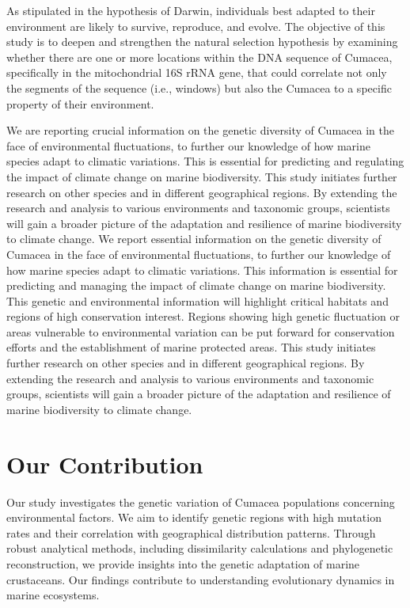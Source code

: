 As stipulated in the hypothesis of Darwin, individuals best adapted to their environment are likely to survive, reproduce, and evolve. The objective of this study is to deepen and strengthen the natural selection hypothesis by examining whether there are one or more locations within the DNA sequence of Cumacea, specifically in the mitochondrial 16S rRNA gene, that could correlate not only the segments of the sequence (i.e., windows) but also the Cumacea to a specific property of their environment. 

We are reporting crucial information on the genetic diversity of Cumacea in the face of environmental fluctuations, to further our knowledge of how marine species adapt to climatic variations. This is essential for predicting and regulating the impact of climate change on marine biodiversity. This study initiates further research on other species and in different geographical regions. By extending the research and analysis to various environments and taxonomic groups, scientists will gain a broader picture of the adaptation and resilience of marine biodiversity to climate change. We report essential information on the genetic diversity of Cumacea in the face of environmental fluctuations, to further our knowledge of how marine species adapt to climatic variations. This information is essential for predicting and managing the impact of climate change on marine biodiversity. This genetic and environmental information will highlight critical habitats and regions of high conservation interest. Regions showing high genetic fluctuation or areas vulnerable to environmental variation can be put forward for conservation efforts and the establishment of marine protected areas. This study initiates further research on other species and in different geographical regions. By extending the research and analysis to various environments and taxonomic groups, scientists will gain a broader picture of the adaptation and resilience of marine biodiversity to climate change.

\section{Our Contribution}

Our study investigates the genetic variation of Cumacea populations concerning environmental factors. We aim to identify genetic regions with high mutation rates and their correlation with geographical distribution patterns. Through robust analytical methods, including dissimilarity calculations and phylogenetic reconstruction, we provide insights into the genetic adaptation of marine crustaceans. Our findings contribute to understanding evolutionary dynamics in marine ecosystems.

